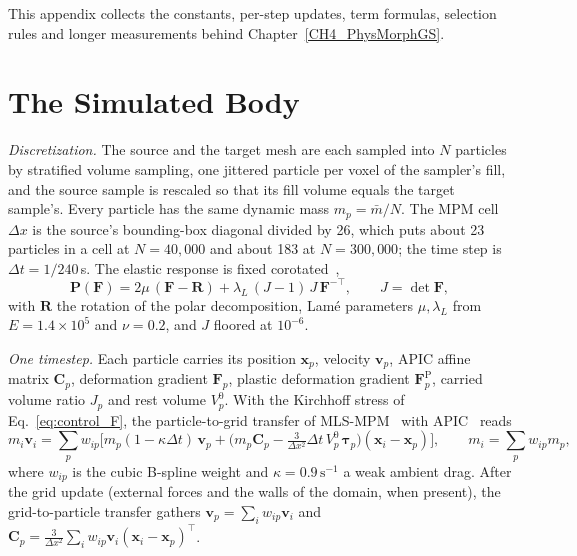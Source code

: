 This appendix collects the constants, per-step updates, term formulas, selection rules and longer measurements behind
Chapter~\ref{CH4_PhysMorphGS}.

\section{The Simulated Body}
\label{app:ch4_body}

\textit{Discretization.} The source and the target mesh are each sampled into $N$ particles by stratified volume sampling,
one jittered particle per voxel of the sampler's fill, and the source sample is rescaled so that its fill volume equals
the target sample's. Every particle has the same dynamic mass $m_p=\bar m/N$. The MPM cell $\Delta x$ is the source's
bounding-box diagonal divided by 26, which puts about 23 particles in a cell at $N=40{,}000$ and about 183 at
$N=300{,}000$; the time step is $\Delta t=1/240$\,s. The elastic response is fixed
corotated~\citep{stomakhin2012energetically,2013-mpm},
\begin{equation}
\label{eq:fc_stress}
\mathbf{P}(\mathbf{F})=2\mu\,(\mathbf{F}-\mathbf{R})+\lambda_{L}\,(J-1)\,J\,\mathbf{F}^{-\top},
\qquad J=\det\mathbf{F},
\end{equation}
with $\mathbf{R}$ the rotation of the polar decomposition, Lam\'e parameters $\mu,\lambda_L$ from $E=1.4\times10^{5}$ and
$\nu=0.2$, and $J$ floored at $10^{-6}$.

\textit{One timestep.} Each particle carries its position $\mathbf{x}_p$, velocity $\mathbf{v}_p$, APIC affine matrix
$\mathbf{C}_p$, deformation gradient $\mathbf{F}_p$, plastic deformation gradient $\mathbf{F}^{\mathrm{P}}_p$, carried volume
ratio $J_p$ and rest volume $V^0_p$. With the Kirchhoff stress of Eq.~\eqref{eq:control_F}, the particle-to-grid transfer
of MLS-MPM~\citep{2018-MLSMPM} with APIC~\citep{2015-APIC} reads
\begin{equation}
\label{ch4:eq_p2g}
m_i\mathbf{v}_i=\sum_p w_{ip}\Big[m_p(1-\kappa\Delta t)\,\mathbf{v}_p
  +\Big(m_p\mathbf{C}_p-\tfrac{3}{\Delta x^{2}}\Delta t\,V^0_p\,\boldsymbol{\tau}_p\Big)(\mathbf{x}_i-\mathbf{x}_p)\Big],
\qquad m_i=\sum_p w_{ip}m_p ,
\end{equation}
where $w_{ip}$ is the cubic B-spline weight and $\kappa=0.9\,\mathrm{s}^{-1}$ a weak ambient drag. After the grid update
(external forces and the walls of the domain, when present), the grid-to-particle transfer gathers
$\mathbf{v}_p=\sum_i w_{ip}\mathbf{v}_i$ and $\mathbf{C}_p=\tfrac{3}{\Delta x^2}\sum_i w_{ip}\mathbf{v}_i(\mathbf{x}_i-\mathbf{x}_p)^{\top}$.


